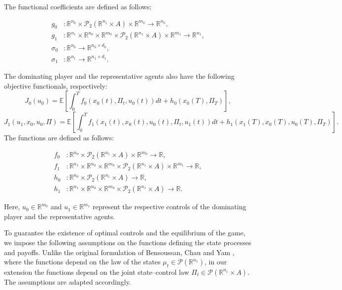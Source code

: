 \documentclass[12pt]{article}
\theoremstyle{definition}
\begin{document}
The functional coefficients are defined as follows:

\[
\begin{aligned}
    g_0 &: \mathbb{R}^{n_0} \times \mathcal{P}_2(\mathbb{R}^{n_1}\times A) \times \mathbb{R}^{m_0} \to \mathbb{R}^{n_0}, \\
    g_1 &: \mathbb{R}^{n_1} \times \mathbb{R}^{n_0} \times \mathbb{R}^{m_0} \times \mathcal{P}_2(\mathbb{R}^{n_1}\times A) \times \mathbb{R}^{m_1} \to \mathbb{R}^{n_1}, \\
    \sigma_0 &: \mathbb{R}^{n_0} \to \mathbb{R}^{n_0 \times d_0}, \\
    \sigma_1 &: \mathbb{R}^{n_1} \to \mathbb{R}^{n_1 \times d_1}.
\end{aligned}
\]

The dominating player and the representative agents also have the following objective functionals, respectively:
\begin{equation}
\label{eq:J0}
    J_0(u_0) = \mathbb{E} \left[ \int_0^T f_0 \left( x_0(t), \Pi_t, u_0(t) \right) dt + h_0 \left( x_0(T), \Pi_T \right) \right],
\end{equation}
\begin{equation}
\label{eq:J1}
    J_1(u_1, x_0, u_0, \Pi) = \mathbb{E} \left[ \int_0^T f_1 \left( x_1(t), x_0(t), u_0(t), \Pi_t, u_1(t) \right) dt + h_1 \left( x_1(T), x_0(T), u_0(T), \Pi_T \right) \right].
\end{equation}
The functions are defined as follows:

\[
\begin{aligned}
    f_0 &: \mathbb{R}^{n_0} \times \mathcal{P}_2(\mathbb{R}^{n_1}\times A) \times \mathbb{R}^{m_0} \to \mathbb{R}, \\
    f_1 &: \mathbb{R}^{n_1} \times \mathbb{R}^{n_0} \times \mathbb{R}^{m_0} \times \mathcal{P}_2(\mathbb{R}^{n_1}\times A) \times \mathbb{R}^{m_1} \to \mathbb{R}, \\
    h_0 &: \mathbb{R}^{n_0} \times \mathcal{P}_2(\mathbb{R}^{n_1}\times A) \to \mathbb{R}, \\
    h_1 &: \mathbb{R}^{n_1} \times \mathbb{R}^{n_0} \times \mathbb{R}^{m_0} \times \mathcal{P}_2(\mathbb{R}^{n_1}\times A) \to \mathbb{R}.
\end{aligned}
\]

Here, \( u_0 \in \mathbb{R}^{m_0} \) and \( u_1 \in \mathbb{R}^{m_1} \) represent the respective controls of the dominating player and the representative agents.


To guarantee the existence of optimal controls and the equilibrium of the game, we impose the following assumptions on the functions defining the state processes and payoffs. Unlike the original formulation of Bensoussan, Chau and Yam \cite{bensoussan2014mfgdominating}, where the functions depend on the law of the states $\mu_t\in\mathcal{P}(\mathbb{R}^{n_1})$, in our extension the functions depend on the joint state--control law $\Pi_t\in\mathcal{P}(\mathbb{R}^{n_1}\times A)$. The assumptions are adapted accordingly.
\end{document}
